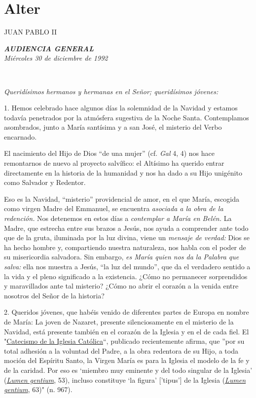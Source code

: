 \section{Alter}
JUAN PABLO II

\emph{\textbf{AUDIENCIA GENERAL}}\\[2\baselineskip]\emph{Miércoles 30 de
	diciembre de 1992}

~

\emph{Queridísimos hermanos y hermanas en el Señor; queridísimos
	jóvenes:}

1. Hemos celebrado hace algunos días la solemnidad de la Navidad y
estamos todavía penetrados por la atmósfera sugestiva de la Noche Santa.
Contemplamos asombrados, junto a María santísima y a san José, el
misterio del Verbo encarnado.

El nacimiento del Hijo de Dios ``de una mujer'' (cf. \emph{Gal} 4, 4)
nos hace remontarnos de nuevo al proyecto salvífico: el Altísimo ha
querido entrar directamente en la historia de la humanidad y nos ha dado
a su Hijo unigénito como Salvador y Redentor.

Eso es la Navidad, ``misterio'' providencial de amor, en el que María,
escogida como virgen Madre del Emmanuel, se encuentra \emph{asociada a
	la obra de la redención.} Nos detenemos en estos días a \emph{contemplar
	a María en Belén.} La Madre, que estrecha entre sus brazos a Jesús, nos
ayuda a comprender ante todo que de la gruta, iluminada por la luz
divina, viene un \emph{mensaje de verdad:} Dios se ha hecho hombre y,
compartiendo nuestra naturaleza, nos habla con el poder de su
misericordia salvadora. Sin embargo, \emph{es María quien nos da la
	Palabra que salva:} ella nos muestra a Jesús, ``la luz del mundo'', que
da el verdadero sentido a la vida y el pleno significado a la
existencia. ¿Cómo no permanecer sorprendidos y maravillados ante tal
misterio? ¿Cómo no abrir el corazón a la venida entre nosotros del Señor
de la historia?

2. Queridos jóvenes, que habéis venido de diferentes partes de Europa en
nombre de María: La joven de Nazaret, presente silenciosamente en el
misterio de la Navidad, está presente también en el corazón de la
Iglesia y en el de cada fiel. El
"\href{http://www.vatican.va/archive/catechism_sp/index_sp.html}{Catecismo
	de la Iglesia Católica}``, publicado recientemente afirma, que ''por su
total adhesión a la voluntad del Padre, a la obra redentora de su Hijo,
a toda moción del Espíritu Santo, la Virgen María es para la Iglesia el
modelo de la fe y de la caridad. Por eso es `miembro muy eminente y del
todo singular de la Iglesia'
(\emph{\href{http://www.vatican.va/archive/hist_councils/ii_vatican_council/documents/vat-ii_const_19641121_lumen-gentium_sp.html}{Lumen
		gentium}}, 53), \emph{} incluso constituye `la figura' {[}'tipus'{]} de
la Iglesia
(\emph{\href{http://www.vatican.va/archive/hist_councils/ii_vatican_council/documents/vat-ii_const_19641121_lumen-gentium_sp.html}{Lumen
		gentium}}, 63)" (n. 967).

